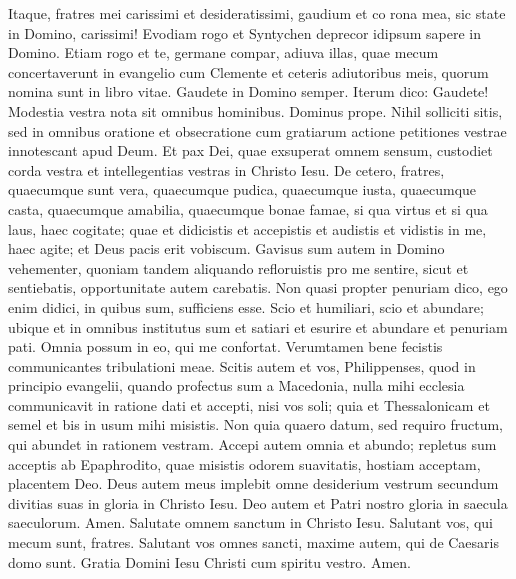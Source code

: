 \begin{biblechapter}  
\verse Itaque, fratres mei carissimi et desideratissimi, gaudium et co rona mea, sic state in Domino, carissimi! 
\verse Evodiam rogo et Syntychen deprecor idipsum sapere in Domino. 
\verse Etiam rogo et te, germane compar, adiuva illas, quae mecum concertaverunt in evangelio cum Clemente et ceteris adiutoribus meis, quorum nomina sunt in libro vitae. 
\verse Gaudete in Domino semper. Iterum dico: Gaudete! 
\verse Modestia vestra nota sit omnibus hominibus. Dominus prope. 
\verse Nihil solliciti sitis, sed in omnibus oratione et obsecratione cum gratiarum actione petitiones vestrae innotescant apud Deum. 
\verse Et pax Dei, quae exsuperat omnem sensum, custodiet corda vestra et intellegentias vestras in Christo Iesu. 
\verse De cetero, fratres, quaecumque sunt vera, quaecumque pudica, quaecumque iusta, quaecumque casta, quaecumque amabilia, quaecumque bonae famae, si qua virtus et si qua laus, haec cogitate;  
\verse quae et didicistis et accepistis et audistis et vidistis in me, haec agite; et Deus pacis erit vobiscum. 
\verse Gavisus sum autem in Domino vehementer, quoniam tandem aliquando refloruistis pro me sentire, sicut et sentiebatis, opportunitate autem carebatis. 
\verse Non quasi propter penuriam dico, ego enim didici, in quibus sum, sufficiens esse.  
\verse Scio et humiliari, scio et abundare; ubique et in omnibus institutus sum et satiari et esurire et abundare et penuriam pati. 
\verse Omnia possum in eo, qui me confortat. 
\verse Verumtamen bene fecistis communicantes tribulationi meae. 
\verse Scitis autem et vos, Philippenses, quod in principio evangelii, quando profectus sum a Macedonia, nulla mihi ecclesia communicavit in ratione dati et accepti, nisi vos soli; 
\verse quia et Thessalonicam et semel et bis in usum mihi misistis. 
\verse Non quia quaero datum, sed requiro fructum, qui abundet in rationem vestram.  
\verse Accepi autem omnia et abundo; repletus sum acceptis ab Epaphrodito, quae misistis odorem suavitatis, hostiam acceptam, placentem Deo. 
\verse Deus autem meus implebit omne desiderium vestrum secundum divitias suas in gloria in Christo Iesu. 
\verse Deo autem et Patri nostro gloria in saecula saeculorum. Amen. 
\verse Salutate omnem sanctum in Christo Iesu. Salutant vos, qui mecum sunt, fratres. 
\verse Salutant vos omnes sancti, maxime autem, qui de Caesaris domo sunt. 
\verse Gratia Domini Iesu Christi cum spiritu vestro. Amen.
\end{biblechapter}

